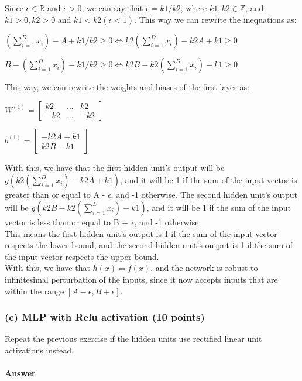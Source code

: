 \documentclass{article}
\begin{document}
Since $\epsilon \in \mathbb{R}$ and $\epsilon > 0$, we can say that $\epsilon = k1/k2$, where $k1, k2 \in \mathbb{Z}$, and $k1 > 0, k2 > 0$ and $k1 < k2
(\epsilon < 1)$.
This way we can rewrite the inequations as:

$(\sum_{i=1}^{D} x_i) - A + k1/k2 \geq 0 \iff k2(\sum_{i=1}^{D} x_i) - k2A + k1 \geq 0$

$B - (\sum_{i=1}^{D} x_i) - k1/k2 \geq 0 \iff k2B - k2(\sum_{i=1}^{D} x_i) - k1 \geq 0$

This way, we can rewrite the weights and biases of the first layer as:

\( W^{(1)} = \begin{bmatrix}
    k2  & ... & k2  \\
    -k2 & ... & -k2
\end{bmatrix}
\)

\(b^{(1)} = \begin{bmatrix}
    -k2A + k1 \\
    k2B - k1
\end{bmatrix}
\)

With this, we have that the first hidden unit's output will be $g(k2(\sum_{i=1}^{D} x_i) - k2A + k1)$, and it will be 1 if the sum of the 
input vector is greater than or equal to A - $\epsilon$, and -1 otherwise. The second hidden unit's output will be $g(k2B - k2(\sum_{i=1}^{D} x_i) - k1)$,
and it will be 1 if the sum of the input vector is less than or equal to B + $\epsilon$, and -1 otherwise. \\
This means the first hidden unit's output is 1 if the sum of the input vector respects the lower bound,
and the second hidden unit's output is 1 if the sum of the input vector respects the upper bound. \\
With this, we have that \(h(x) = f(x)\), and the network is robust to infinitesimal perturbation of the inputs, since it now accepts inputs
that are within the range \([A - \epsilon, B + \epsilon]\).

\subsubsection*{(c) MLP with Relu activation (10 points)}

Repeat the previous exercise if the hidden units use rectified linear unit activations instead. 

\paragraph{Answer}
\end{document}
